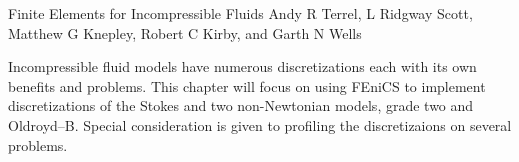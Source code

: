               {Finite Elements for Incompressible Fluids}
              {Andy R Terrel, L Ridgway Scott, Matthew G Knepley, Robert C Kirby, and Garth N Wells}

\editornote{[terrel]}

Incompressible fluid models have numerous discretizations each with
its own benefits and problems. This chapter will focus on using FEniCS
to implement discretizations of the Stokes and two non-Newtonian
models, grade two and Oldroyd--B. Special consideration is given to
profiling the discretizaions on several problems.
